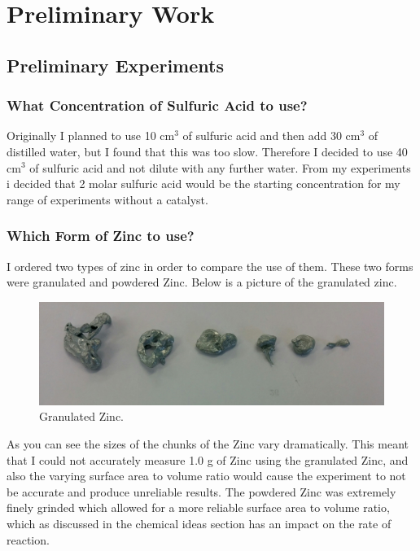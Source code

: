 \chapter {Preliminary Work}

\section {Preliminary Experiments}

	\subsection {What Concentration of Sulfuric Acid to use?}

Originally I planned to use 10 cm$^3$ of sulfuric acid and then add 30 cm$^3$ of distilled water, but I found that this was too slow. Therefore I decided to use 40 cm$^3$ of sulfuric acid and not dilute with any further water. From my experiments i decided that 2 molar sulfuric acid would be the starting concentration for my range of experiments without a catalyst.









	\subsection{Which Form of Zinc to use?}

I ordered two types of zinc in order to compare the use of them. These two forms were granulated and powdered Zinc. Below is a picture of the granulated zinc.

\begin{figure}[H]
    \includegraphics[width=\textwidth]{./preliminarywork/images/GranulatedZinc.jpg}
    \caption{Granulated Zinc.} \label{fig:Granulated Zinc}
\end{figure}

As you can see the sizes of the chunks of the Zinc vary dramatically. This meant that I could not accurately measure 1.0 g of Zinc using the granulated Zinc, and also the varying surface area to volume ratio would cause the experiment to not be accurate and produce unreliable results. The powdered Zinc was extremely finely grinded which allowed for a more reliable surface area to volume ratio, which as discussed in the chemical ideas section has an impact on the rate of reaction.



